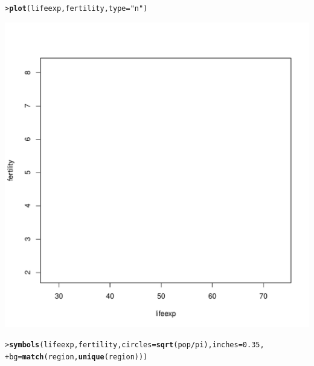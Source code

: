 \documentclass[12pt,oneside]{book}\usepackage[]{graphicx}\usepackage[]{color}
\makeatletter
\def\maxwidth{ %
  \ifdim\Gin@nat@width>\linewidth
    \linewidth
  \else
    \Gin@nat@width
  \fi
}
\newcommand{\hlnum}[1]{\textcolor[rgb]{0.686,0.059,0.569}{#1}}%
\newcommand{\hlstr}[1]{\textcolor[rgb]{0.192,0.494,0.8}{#1}}%
\newcommand{\hlopt}[1]{\textcolor[rgb]{0,0,0}{#1}}%
\newcommand{\hlstd}[1]{\textcolor[rgb]{0.345,0.345,0.345}{#1}}%
\newcommand{\hlkwc}[1]{\textcolor[rgb]{0.333,0.667,0.333}{#1}}%
\newcommand{\hlkwd}[1]{\textcolor[rgb]{0.737,0.353,0.396}{\textbf{#1}}}%
\newenvironment{kframe}{%
 \def\at@end@of@kframe{}%
 \ifinner\ifhmode%
  \def\at@end@of@kframe{\end{minipage}}%
  \begin{minipage}{\columnwidth}%
 \fi\fi%
 \def\FrameCommand##1{\hskip\@totalleftmargin \hskip-\fboxsep
 \colorbox{shadecolor}{##1}\hskip-\fboxsep
     \hskip-\linewidth \hskip-\@totalleftmargin \hskip\columnwidth}%
 \MakeFramed {\advance\hsize-\width
   \@totalleftmargin\z@ \linewidth\hsize
   \@setminipage}}%
 {\par\unskip\endMakeFramed%
 \at@end@of@kframe}
\newenvironment{knitrout}{}{} %
\makeatother
\begin{document}
\begin{knitrout}
\color{fgcolor}\begin{kframe}
\begin{alltt}
\hlstd{> }\hlkwd{plot}\hlstd{(lifeexp, fertility,} \hlkwc{type}\hlstd{=}\hlstr{"n"}\hlstd{)}
\end{alltt}
\end{kframe}
\includegraphics[width=\maxwidth]{figure/unnamed-chunk-24-1} 
\begin{kframe}\begin{alltt}
\hlstd{> }\hlkwd{symbols}\hlstd{(lifeexp, fertility,} \hlkwc{circles}\hlstd{=}\hlkwd{sqrt}\hlstd{(pop}\hlopt{/}\hlstd{pi),} \hlkwc{inches}\hlstd{=}\hlnum{0.35}\hlstd{,}
\hlstd{+ }        \hlkwc{bg}\hlstd{=}\hlkwd{match}\hlstd{(region,} \hlkwd{unique}\hlstd{(region)))}
\end{alltt}
\end{kframe}

\end{knitrout}
\end{document}
